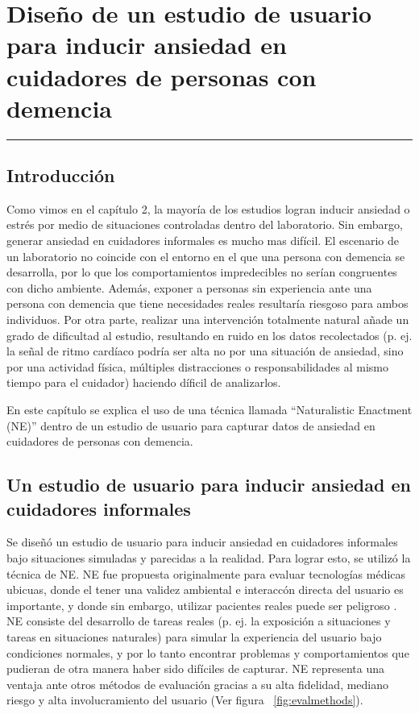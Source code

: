 \chapter{Dise\~no de un estudio de usuario para inducir ansiedad en cuidadores de personas con demencia}\label{capit:cap3}
\vspace{-2.0325ex}%
\noindent
\rule{\textwidth}{0.5pt}
\vspace{-5.5ex}%
\newcommand{\pushline}{\Indp}%
\section{Introducci\'on}\label{secc:introduction}

Como vimos en el cap\'itulo 2, la mayor\'ia de los estudios logran inducir ansiedad o estr\'es por medio de situaciones controladas dentro del laboratorio. Sin embargo, generar ansiedad en cuidadores informales es mucho mas dif\'icil. El escenario de un laboratorio no coincide con el entorno en el que una persona con demencia se desarrolla, por lo que los comportamientos impredecibles no ser\'ian congruentes con dicho ambiente. Adem\'as, exponer a personas sin experiencia ante una persona con demencia que tiene necesidades reales resultar\'ia riesgoso para ambos individuos. Por otra parte, realizar una intervenci\'on totalmente natural a\~nade un grado de dificultad al estudio, resultando en ruido en los datos recolectados (p. ej. la se\~nal de ritmo card\'iaco podr\'ia ser alta no por una situaci\'on de ansiedad, sino por una actividad f\'isica, m\'ultiples distracciones o responsabilidades al mismo tiempo para el cuidador) haciendo d\'ificil de analizarlos.

En este cap\'itulo se explica el uso de una t\'ecnica llamada ``Naturalistic Enactment (NE)'' \citep{Castro11} dentro de un estudio de usuario para capturar datos de ansiedad en cuidadores de personas con demencia.


\section{Un estudio de usuario para inducir ansiedad en cuidadores informales}\label{secc:experiment}
Se dise\~n\'o un estudio de usuario para inducir ansiedad en cuidadores informales bajo situaciones simuladas y parecidas a la realidad. Para lograr esto, se utiliz\'o la t\'ecnica de NE. NE fue propuesta originalmente para evaluar tecnolog\'ias m\'edicas ubicuas, donde el tener una validez ambiental e interacc\'on directa del usuario es importante, y donde sin embargo, utilizar pacientes reales puede ser peligroso \citep{Castro11}. NE consiste del desarrollo de tareas reales (p. ej. la exposici\'on a situaciones y tareas en situaciones naturales) para simular la experiencia del usuario bajo condiciones normales, y por lo tanto encontrar problemas y comportamientos que pudieran de otra manera haber sido dif\'iciles de capturar. NE representa una ventaja ante otros m\'etodos de evaluaci\'on gracias a su alta fidelidad, mediano riesgo y alta involucramiento del usuario (Ver figura ~\ref{fig:evalmethods}).

